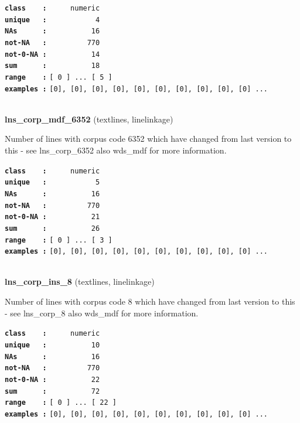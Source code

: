 \documentclass[]{article}
\begin{document}
\textbf{\texttt{class\ \ \ \ :}} \texttt{~~~~~numeric}\\
\textbf{\texttt{unique\ \ \ :}} \texttt{~~~~~~~~~~~4}\\
\textbf{\texttt{NAs\ \ \ \ \ \ :}} \texttt{~~~~~~~~~~16}\\
\textbf{\texttt{not-NA\ \ \ :}} \texttt{~~~~~~~~~770}\\
\textbf{\texttt{not-0-NA\ :}} \texttt{~~~~~~~~~~14}\\
\textbf{\texttt{sum\ \ \ \ \ \ :}} \texttt{~~~~~~~~~~18}\\
\textbf{\texttt{range\ \ \ \ :}}
\texttt{{[}\ 0\ {]}\ ...\ {[}\ 5\ {]}}\\
\textbf{\texttt{examples\ :}}
\texttt{{[}0{]},\ {[}0{]},\ {[}0{]},\ {[}0{]},\ {[}0{]},\ {[}0{]},\ {[}0{]},\ {[}0{]},\ {[}0{]},\ {[}0{]}\ ...}\\

~

\textbf{lns\_corp\_mdf\_6352} (textlines, linelinkage)

Number of lines with corpus code 6352 which have changed from last
version to this - see lns\_corp\_6352 also wds\_mdf for more
information.

\textbf{\texttt{class\ \ \ \ :}} \texttt{~~~~~numeric}\\
\textbf{\texttt{unique\ \ \ :}} \texttt{~~~~~~~~~~~5}\\
\textbf{\texttt{NAs\ \ \ \ \ \ :}} \texttt{~~~~~~~~~~16}\\
\textbf{\texttt{not-NA\ \ \ :}} \texttt{~~~~~~~~~770}\\
\textbf{\texttt{not-0-NA\ :}} \texttt{~~~~~~~~~~21}\\
\textbf{\texttt{sum\ \ \ \ \ \ :}} \texttt{~~~~~~~~~~26}\\
\textbf{\texttt{range\ \ \ \ :}}
\texttt{{[}\ 0\ {]}\ ...\ {[}\ 3\ {]}}\\
\textbf{\texttt{examples\ :}}
\texttt{{[}0{]},\ {[}0{]},\ {[}0{]},\ {[}0{]},\ {[}0{]},\ {[}0{]},\ {[}0{]},\ {[}0{]},\ {[}0{]},\ {[}0{]}\ ...}\\

~

\textbf{lns\_corp\_ins\_8} (textlines, linelinkage)

Number of lines with corpus code 8 which have changed from last version
to this - see lns\_corp\_8 also wds\_mdf for more information.

\textbf{\texttt{class\ \ \ \ :}} \texttt{~~~~~numeric}\\
\textbf{\texttt{unique\ \ \ :}} \texttt{~~~~~~~~~~10}\\
\textbf{\texttt{NAs\ \ \ \ \ \ :}} \texttt{~~~~~~~~~~16}\\
\textbf{\texttt{not-NA\ \ \ :}} \texttt{~~~~~~~~~770}\\
\textbf{\texttt{not-0-NA\ :}} \texttt{~~~~~~~~~~22}\\
\textbf{\texttt{sum\ \ \ \ \ \ :}} \texttt{~~~~~~~~~~72}\\
\textbf{\texttt{range\ \ \ \ :}}
\texttt{{[}\ 0\ {]}\ ...\ {[}\ 22\ {]}}\\
\textbf{\texttt{examples\ :}}
\texttt{{[}0{]},\ {[}0{]},\ {[}0{]},\ {[}0{]},\ {[}0{]},\ {[}0{]},\ {[}0{]},\ {[}0{]},\ {[}0{]},\ {[}0{]}\ ...}\\
\end{document}
